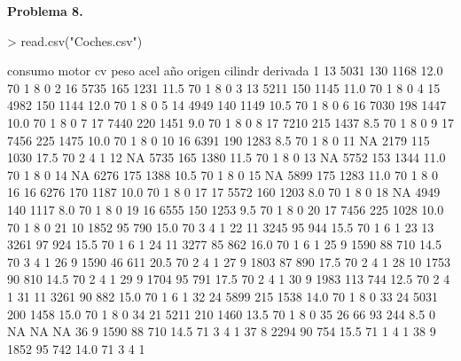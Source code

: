 \documentclass{article}
\begin{document}
\newpage
\textbf{Problema 8.}
\begin{Schunk}
\begin{Sinput}
> read.csv("Coches.csv")
\end{Sinput}
\begin{Soutput}
    consumo motor  cv peso acel año origen cilindr derivada
1        13  5031 130 1168 12.0  70      1       8        0
2        16  5735 165 1231 11.5  70      1       8        0
3        13  5211 150 1145 11.0  70      1       8        0
4        15  4982 150 1144 12.0  70      1       8        0
5        14  4949 140 1149 10.5  70      1       8        0
6        16  7030 198 1447 10.0  70      1       8        0
7        17  7440 220 1451  9.0  70      1       8        0
8        17  7210 215 1437  8.5  70      1       8        0
9        17  7456 225 1475 10.0  70      1       8        0
10       16  6391 190 1283  8.5  70      1       8        0
11       NA  2179 115 1030 17.5  70      2       4        1
12       NA  5735 165 1380 11.5  70      1       8        0
13       NA  5752 153 1344 11.0  70      1       8        0
14       NA  6276 175 1388 10.5  70      1       8        0
15       NA  5899 175 1283 11.0  70      1       8        0
16       16  6276 170 1187 10.0  70      1       8        0
17       17  5572 160 1203  8.0  70      1       8        0
18       NA  4949 140 1117  8.0  70      1       8        0
19       16  6555 150 1253  9.5  70      1       8        0
20       17  7456 225 1028 10.0  70      1       8        0
21       10  1852  95  790 15.0  70      3       4        1
22       11  3245  95  944 15.5  70      1       6        1
23       13  3261  97  924 15.5  70      1       6        1
24       11  3277  85  862 16.0  70      1       6        1
25        9  1590  88  710 14.5  70      3       4        1
26        9  1590  46  611 20.5  70      2       4        1
27        9  1803  87  890 17.5  70      2       4        1
28       10  1753  90  810 14.5  70      2       4        1
29        9  1704  95  791 17.5  70      2       4        1
30        9  1983 113  744 12.5  70      2       4        1
31       11  3261  90  882 15.0  70      1       6        1
32       24  5899 215 1538 14.0  70      1       8        0
33       24  5031 200 1458 15.0  70      1       8        0
34       21  5211 210 1460 13.5  70      1       8        0
35       26    66  93  244  8.5   0     NA      NA       NA
36        9  1590  88  710 14.5  71      3       4        1
37        8  2294  90  754 15.5  71      1       4        1
38        9  1852  95  742 14.0  71      3       4        1

\end{Soutput}
\end{Schunk}
\end{document}
